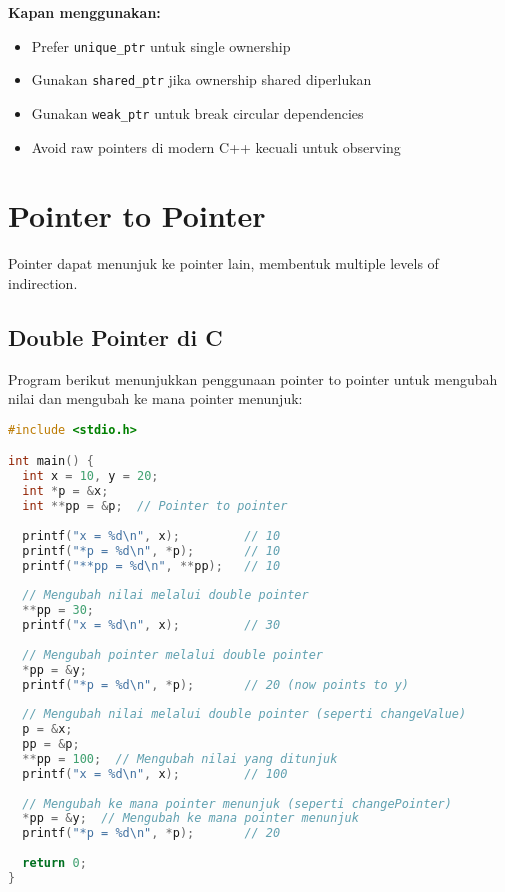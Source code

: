 \documentclass[../main.tex]{subfiles}
\begin{document}
\textbf{Kapan menggunakan:}
\begin{itemize}
  \item Prefer \texttt{unique\_ptr} untuk single ownership
  \item Gunakan \texttt{shared\_ptr} jika ownership shared diperlukan
  \item Gunakan \texttt{weak\_ptr} untuk break circular dependencies
  \item Avoid raw pointers di modern C++ kecuali untuk observing
\end{itemize}

\section{Pointer to Pointer}

Pointer dapat menunjuk ke pointer lain, membentuk multiple levels of indirection.

\subsection{Double Pointer di C}

Program berikut menunjukkan penggunaan pointer to pointer untuk mengubah nilai dan mengubah ke mana pointer menunjuk:

\begin{lstlisting}[language=C, caption={Pointer to pointer di C}]
#include <stdio.h>

int main() {
  int x = 10, y = 20;
  int *p = &x;
  int **pp = &p;  // Pointer to pointer
  
  printf("x = %d\n", x);         // 10
  printf("*p = %d\n", *p);       // 10
  printf("**pp = %d\n", **pp);   // 10
  
  // Mengubah nilai melalui double pointer
  **pp = 30;
  printf("x = %d\n", x);         // 30
  
  // Mengubah pointer melalui double pointer
  *pp = &y;
  printf("*p = %d\n", *p);       // 20 (now points to y)
  
  // Mengubah nilai melalui double pointer (seperti changeValue)
  p = &x;
  pp = &p;
  **pp = 100;  // Mengubah nilai yang ditunjuk
  printf("x = %d\n", x);         // 100
  
  // Mengubah ke mana pointer menunjuk (seperti changePointer)
  *pp = &y;  // Mengubah ke mana pointer menunjuk
  printf("*p = %d\n", *p);       // 20
  
  return 0;
}
\end{lstlisting}
\end{document}
